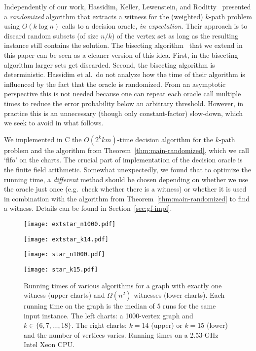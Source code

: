 \documentclass[11pt]{article}
\begin{document}
Independently of our work, Hassidim, Keller, Lewenstein, and Roditty~\cite{hklr_wads} presented a {\em randomized} algorithm that extracts a witness for the (weighted) $k$-path problem using $O(k\log n)$ calls to a decision oracle, {\em in expectation}. 
Their approach is to discard random subsets (of size $n/k$) of the vertex set as long as the resulting instance still contains the solution. The bisecting algorithm~\cite{DuHwang1993} that we extend in this paper can be seen as a cleaner version of this idea.
First, in the bisecting algorithm larger sets get discarded. Second, the bisecting algorithm is deterministic. 
Hassidim et al.\ do not analyze how the time of their algorithm is influenced by the fact that the oracle is randomized. From an asymptotic perspective this is not needed because one can repeat each oracle call multiple times to reduce the error probability below an arbitrary threshold. However, in practice this is an unnecessary (though only constant-factor) slow-down, which we seek to avoid in what follows.

We implemented in C the $O(2^kkm)$-time decision algorithm for the $k$-path problem and the algorithm from Theorem~\ref{thm:main-randomized}, which we call `fifo' on the charts. 
The crucial part of implementation of the decision oracle is the finite field arithmetic. 
Somewhat unexpectedly, we found that to optimize the running time, a {\em different} method should be chosen depending on whether we use the oracle just once (e.g.\ check whether there is a witness) or whether it is used in combination with the algorithm from Theorem~\ref{thm:main-randomized} to find a witness.
Details can be found in Section~\ref{sec:gf-impl}.

\begin{figure}[t]
\begin{minipage}[b]{0.5\linewidth}
\centering
\texttt{[image: extstar\_n1000.pdf]}
\end{minipage}
\begin{minipage}[b]{0.5\linewidth}
\centering
\texttt{[image: extstar\_k14.pdf]}
\end{minipage}
\begin{minipage}[b]{0.5\linewidth}
\centering
\texttt{[image: star\_n1000.pdf]}
\end{minipage}
\begin{minipage}[b]{0.5\linewidth}
\centering
\texttt{[image: star\_k15.pdf]}
\end{minipage}
\caption{\label{fig:alg_charts}
         Running times of various algorithms for a graph with exactly one witness (upper charts) and  $\Omega(n^2)$ witnesses (lower charts). 
         Each running time on the graph is the median of 5 runs for the same input instance.
         The left charts: a 1000-vertex graph and $k\in\{6,7,\ldots,18\}$.
         The right charts: $k=14$ (upper) or $k=15$ (lower) and the number of vertices varies. Running times on a 2.53-GHz Intel Xeon CPU.
         }
\end{figure}
\end{document}
